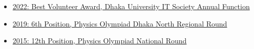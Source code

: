 \documentclass[letterpaper,11pt]{article}
\begin{document}
\begin{itemize}[leftmargin=0.15in]
    \item \href{https://www.linkedin.com/posts/abdullaharean_alhamdulillah-awarded%F0%9D%97%95%F0%9D%97%B2%F0%9D%98%80%F0%9D%98%81-%F0%9D%97%A9%F0%9D%97%BC%F0%9D%97%B9%F0%9D%98%82-activity-6996676041817669632-7uZK?utm_source=social_share_send&utm_medium=member_desktop_web&rcm=ACoAADA0SqcBFs_96NpHtIVeS5AoqAZzWIEeQ28}{2022: Best Volunteer Award, Dhaka University IT Society Annual Function}
    \item \href{https://drive.google.com/file/d/1XfBGqnFZdk5kAWYaxUz4ZkmdEGU7P6x_/view?usp=sharing}{2019: 6th Position, Physics Olympiad Dhaka North Regional Round}
    \item \href{https://drive.google.com/file/d/1WYHBiMhgMp29h7E2210-LBOyDajiJbTv/view?usp=sharing}{2015: 12th Position, Physics Olympiad National Round}
\end{itemize}
\end{document}
